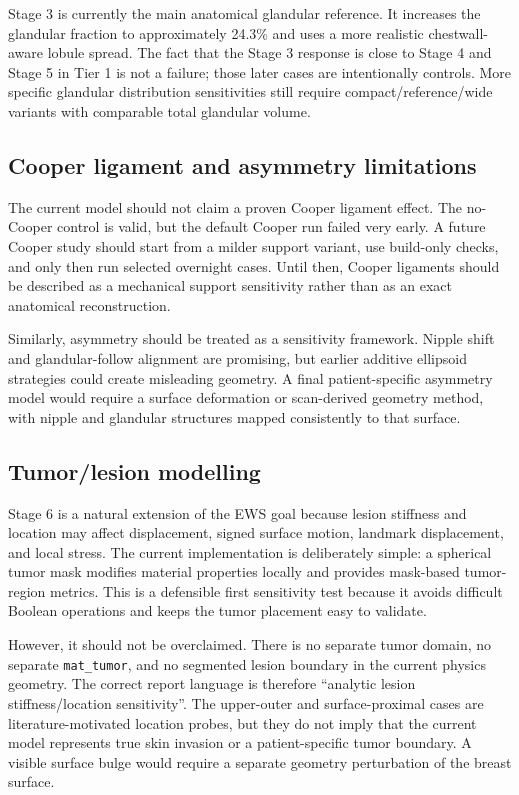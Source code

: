 Stage 3 is currently the main anatomical glandular reference. It increases the glandular fraction to approximately 24.3\% and uses a more realistic chestwall-aware lobule spread. The fact that the Stage 3 response is close to Stage 4 and Stage 5 in Tier 1 is not a failure; those later cases are intentionally controls. More specific glandular distribution sensitivities still require compact/reference/wide variants with comparable total glandular volume.

\subsection{Cooper ligament and asymmetry limitations}

The current model should not claim a proven Cooper ligament effect. The no-Cooper control is valid, but the default Cooper run failed very early. A future Cooper study should start from a milder support variant, use build-only checks, and only then run selected overnight cases. Until then, Cooper ligaments should be described as a mechanical support sensitivity rather than as an exact anatomical reconstruction.

Similarly, asymmetry should be treated as a sensitivity framework. Nipple shift and glandular-follow alignment are promising, but earlier additive ellipsoid strategies could create misleading geometry. A final patient-specific asymmetry model would require a surface deformation or scan-derived geometry method, with nipple and glandular structures mapped consistently to that surface.

\subsection{Tumor/lesion modelling}

Stage 6 is a natural extension of the EWS goal because lesion stiffness and location may affect displacement, signed surface motion, landmark displacement, and local stress. The current implementation is deliberately simple: a spherical tumor mask modifies material properties locally and provides mask-based tumor-region metrics. This is a defensible first sensitivity test because it avoids difficult Boolean operations and keeps the tumor placement easy to validate.

However, it should not be overclaimed. There is no separate tumor domain, no separate \texttt{mat\_tumor}, and no segmented lesion boundary in the current physics geometry. The correct report language is therefore ``analytic lesion stiffness/location sensitivity''. The upper-outer and surface-proximal cases are literature-motivated location probes, but they do not imply that the current model represents true skin invasion or a patient-specific tumor boundary. A visible surface bulge would require a separate geometry perturbation of the breast surface.

